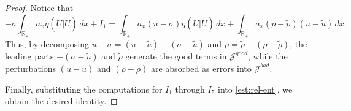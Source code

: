 \documentclass[11pt,reqno]{amsart}
\numberwithin{equation}{section} %
\newcommand{\R}{\mathbb{R}}
\begin{document}
\begin{proof}
    Notice that 
    \[-\sigma\int_{\R_+}a_x\eta(U|\tilde{U})\,dx +I_1=\int_{\R_+}a_x(u-\sigma)\eta(U|\tilde{U})\,dx+\int_{\R_+}a_x(p-\tilde{p})(u-\tilde{u})\,dx.\]
	Thus, by decomposing $u-\sigma = (u-\tilde{u}) - (\sigma-\tilde{u})$ and $\rho = \tilde{\rho} + (\rho-\tilde{\rho})$, the leading parts $-(\sigma-\tilde{u})$ and $\tilde{\rho}$ generate the good terms in $\mathcal{J}^{good}$, while the perturbations $(u-\tilde{u})$ and $(\rho-\tilde{\rho})$ are absorbed as errors into $\mathcal{J}^{bad}$.

Finally, substituting the computations for $I_1$ through $I_5$ into \eqref{est:rel-ent}, we obtain the desired identity.



\end{proof}
\end{document}
